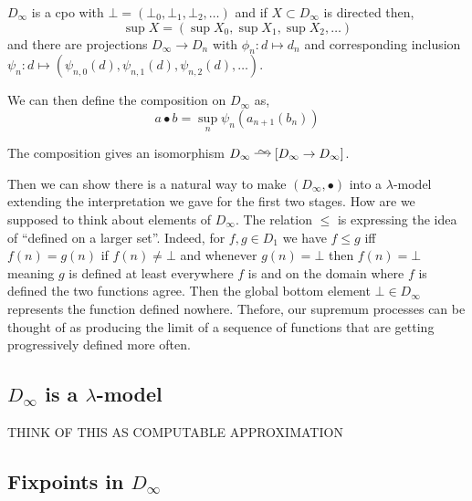 \documentclass[12pt]{article}
\begin{document}
\begin{prop}
$D_\infty$ is a cpo with $\bot = (\bot_0, \bot_1, \bot_2, \dots)$ and if $X \subset D_{\infty}$ is directed then,
\[ \sup X = (\sup X_0, \sup X_1, \sup X_2, \dots) \]
and there are projections $D_{\infty} \to D_n$ with $\phi_n : d \mapsto d_n$ and corresponding inclusion $\psi_n : d \mapsto (\psi_{n,0}(d), \psi_{n,1}(d), \psi_{n,2}(d), \dots)$.
\end{prop}

We can then define the composition on $D_{\infty}$ as,
\[ a \bullet b = \sup_n \psi_n(a_{n+1}(b_n)) \]

\begin{prop}
The composition gives an isomorphism $D_{\infty} \iso [D_{\infty} \to D_{\infty}]$. 
\end{prop}

Then we can show there is a natural way to make $(D_\infty, \bullet)$ into a $\lambda$-model extending the interpretation we gave for the first two stages. How are we supposed to think about elements of $D_\infty$. The relation $\le$ is expressing the idea of ``defined on a larger set''. Indeed, for $f,g \in D_1$ we have $f \le g$ iff $f(n) = g(n)$ if $f(n) \neq \bot$ and whenever $g(n) = \bot$ then $f(n) = \bot$ meaning $g$ is defined at least everywhere $f$ is and on the domain where $f$ is defined the two functions agree. Then the global bottom element $\bot \in D_\infty$ represents the function defined nowhere. Thefore, our supremum processes can be thought of as producing the limit of a sequence of functions that are getting progressively defined more often. 

\subsection{$D_\infty$ is a $\lambda$-model}

THINK OF THIS AS COMPUTABLE APPROXIMATION

\subsection{Fixpoints in $D_{\infty}$}
\end{document}
